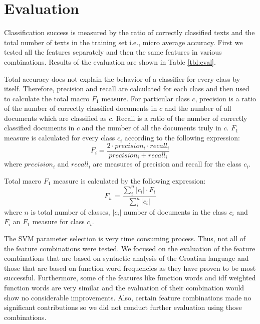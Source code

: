 \documentclass{llncs}
\begin{document}
\section{Evaluation}
\label{sec:evaluacija}
Classification success is measured by the ratio of correctly classified texts and
the total number of texts in the training set i.e., micro average accuracy.
First we tested all the features separately and then the same features in
various combinations. Results of the evaluation
are shown in Table \ref{tbl:eval}.

Total accuracy does not explain the behavior of a classifier for every class by
itself. Therefore, precision and recall are calculated for each class and then
used to calculate the total macro $F_1$ measure. For particular class $c$,
precision is a ratio of the number of correctly classified documents in $c$ and
the number of all documents which are classified as $c$. Recall is a ratio of the
number of correctly classified documents in $c$ and the number of all the
documents truly in $c$. $F_1$ measure is calculated for every class $c_i$
according to the following expression:
\begin{equation}
F_i = \frac{2 \cdot precision_i \cdot recall_i}{precision_i + recall_i}
\end{equation}
where $precision_i$ and $recall_i$ are measures of precision and recall for
the class $c_i$.

Total macro $F_1$ measure is calculated by the following expression:
\begin{equation}
F_w = \frac{\sum^{n}_i |c_i|\cdot F_i}{\sum^n_i|c_i|}
\end{equation}
where $n$ is total number of classes, $|c_i|$ number of documents in the class
$c_i$ and $F_i$ an $F_1$ measure for class $c_i$.

The SVM parameter selection is very time consuming process. Thus, not all of the
feature combinations were tested. We focused on the evaluation of the feature
combinations that are based on syntactic analysis of the Croatian language and
those that are based on function word frequencies as they have proven to be most
successful. Furthermore, some of the features like function words and idf
weighted function words are very similar and the evaluation of their combination
would show no considerable improvements. Also, certain feature combinations made
no significant contributions so we did not conduct further evaluation using
those combinations.
\end{document}
